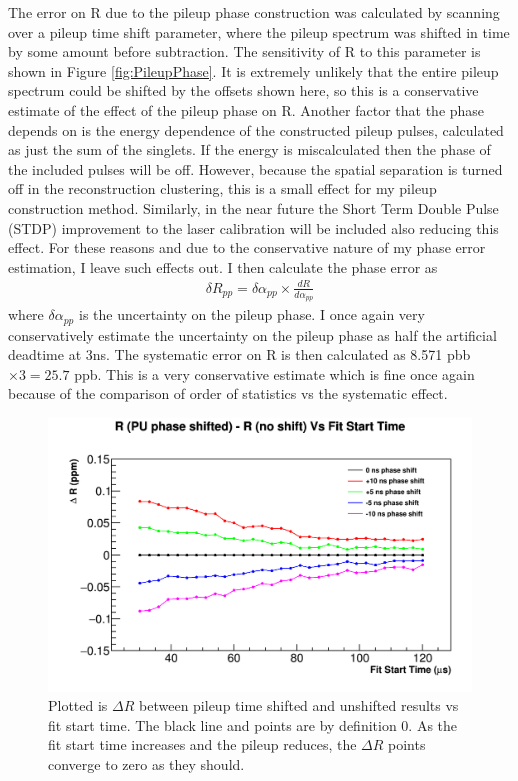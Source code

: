 The error on R due to the pileup phase construction was calculated by scanning over a pileup time shift parameter, where the pileup spectrum was shifted in time by some amount before subtraction. The sensitivity of R to this parameter is shown in Figure \ref{fig:PileupPhase}. It is extremely unlikely that the entire pileup spectrum could be shifted by the offsets shown here, so this is a conservative estimate of the effect of the pileup phase on R. Another factor that the phase depends on is the energy dependence of the constructed pileup pulses, calculated as just the sum of the singlets. If the energy is miscalculated then the phase of the included pulses will be off. However, because the spatial separation is turned off in the reconstruction clustering, this is a small effect for my pileup construction method. Similarly, in the near future the Short Term Double Pulse (STDP) improvement to the laser calibration will be included also reducing this effect. For these reasons and due to the conservative nature of my phase error estimation, I leave such effects out. I then calculate the phase error as 
	\begin{align}
		\delta R_{pp} = \delta\alpha_{pp} \times \frac{dR}{d\alpha_{pp}}
	\end{align}
where $\delta\alpha_{pp}$ is the uncertainty on the pileup phase. I once again very conservatively estimate the uncertainty on the pileup phase as half the artificial deadtime at 3ns. The systematic error on R is then calculated as 8.571 pbb $\times 3 = 25.7$ ppb. This is a very conservative estimate which is fine once again because of the comparison of order of statistics vs the systematic effect.

\begin{figure}[]
	\centering
	\includegraphics[width=.8\textwidth]{pileupTimeShiftComparison}
    \caption[PileupTimeShiftFS]{Plotted is $\Delta R$ between pileup time shifted and unshifted results vs fit start time. The black line and points are by definition 0. As the fit start time increases and the pileup reduces, the $\Delta R$ points converge to zero as they should.}
    \label{fig:PileupTimeShiftFS}
\end{figure}

